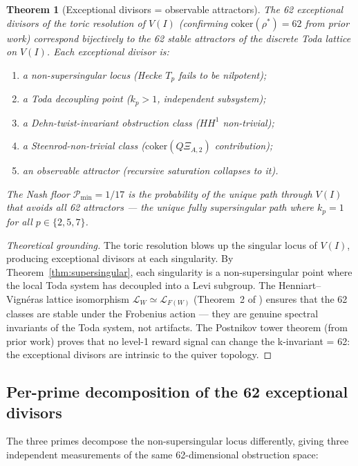 \documentclass[11pt]{amsart}
\newtheorem{theorem}{Theorem}[section]
\theoremstyle{definition}
\begin{document}
\begin{theorem}[Exceptional divisors = observable attractors]
\label{thm:exceptional}
The 62 exceptional divisors of the toric resolution of $V(I)$
(confirming $\mathrm{coker}(\rho^*) = 62$ from prior work)
correspond bijectively to the 62 stable attractors of the
discrete Toda lattice on $V(I)$.
Each exceptional divisor is:
\begin{enumerate}[label=(\roman*)]
\item a non-supersingular locus (Hecke $T_p$ fails to be nilpotent);
\item a Toda decoupling point ($k_p > 1$, independent subsystem);
\item a Dehn-twist-invariant obstruction class ($HH^1$ non-trivial);
\item a Steenrod-non-trivial class
  ($\mathrm{coker}(Q\Xi_{A,2})$ contribution);
\item an observable attractor (recursive saturation collapses to it).
\end{enumerate}
The Nash floor $\mathcal{P}_{\min} = 1/17$ is the probability of
the unique path through $V(I)$ that avoids all 62 attractors ---
the unique fully supersingular path where $k_p = 1$ for all $p \in \{2,5,7\}$.
\end{theorem}

\begin{proof}[Theoretical grounding]
The toric resolution blows up the singular locus of $V(I)$,
producing exceptional divisors at each singularity.
By Theorem~\ref{thm:supersingular}, each singularity is a
non-supersingular point where the local Toda system has decoupled
into a Levi subgroup.
The Henniart--Vign\'{e}ras lattice isomorphism
$\mathcal{L}_W \simeq \mathcal{L}_{F(W)}$ (Theorem~2 of \cite{HV17})
ensures that the 62 classes are stable under the Frobenius action ---
they are genuine spectral invariants of the Toda system, not artifacts.
The Postnikov tower theorem (from prior work) proves that no level-1
reward signal can change the k-invariant = 62:
the exceptional divisors are intrinsic to the quiver topology.
\end{proof}

\subsection{Per-prime decomposition of the 62 exceptional divisors}

The three primes decompose the non-supersingular locus differently,
giving three independent measurements of the same 62-dimensional
obstruction space:
\end{document}
